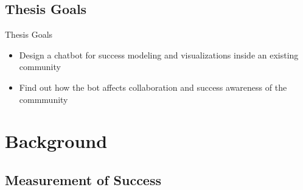 \subsection{Thesis Goals}

\begin{frame}{Thesis Goals}
  \begin{itemize}
    \item Design a chatbot for success modeling and visualizations
          inside an existing community
    \item Find out how the bot affects collaboration and success awareness of the commmunity %
  \end{itemize}
\end{frame}

\section{Background}

\subsection{Measurement of Success}



